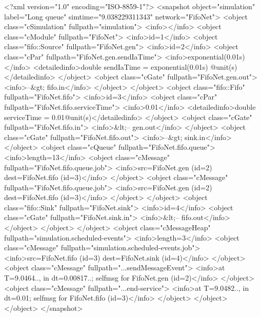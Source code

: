 \begin{filelisting}
<?xml version="1.0" encoding="ISO-8859-1"?>
<snapshot object="simulation" label="Long queue" simtime="9.038229311343"
network="FifoNet">
  <object class="cSimulation" fullpath="simulation">
    <info></info>
    <object class="cModule" fullpath="FifoNet">
      <info>id=1</info>
      <object class="fifo::Source" fullpath="FifoNet.gen">
        <info>id=2</info>
        <object class="cPar" fullpath="FifoNet.gen.sendIaTime">
          <info>exponential(0.01s)</info>
          <detailedinfo>double sendIaTime = exponential(0.01s) @unit(s)
          </detailedinfo>
        </object>
        <object class="cGate" fullpath="FifoNet.gen.out">
          <info>--&gt; fifo.in</info>
        </object>
      </object>
      <object class="fifo::Fifo" fullpath="FifoNet.fifo">
        <info>id=3</info>
        <object class="cPar" fullpath="FifoNet.fifo.serviceTime">
          <info>0.01</info>
          <detailedinfo>double serviceTime = 0.01@unit(s)</detailedinfo>
        </object>
        <object class="cGate" fullpath="FifoNet.fifo.in">
          <info>&lt;-- gen.out</info>
        </object>
        <object class="cGate" fullpath="FifoNet.fifo.out">
          <info>--&gt; sink.in</info>
        </object>
        <object class="cQueue" fullpath="FifoNet.fifo.queue">
          <info>length=13</info>
          <object class="cMessage" fullpath="FifoNet.fifo.queue.job">
            <info>src=FifoNet.gen (id=2)  dest=FifoNet.fifo (id=3)</info>
          </object>
          <object class="cMessage" fullpath="FifoNet.fifo.queue.job">
            <info>src=FifoNet.gen (id=2)  dest=FifoNet.fifo (id=3)</info>
          </object>
        </object>
      <object class="fifo::Sink" fullpath="FifoNet.sink">
        <info>id=4</info>
        <object class="cGate" fullpath="FifoNet.sink.in">
          <info>&lt;-- fifo.out</info>
        </object>
      </object>
    </object>
    <object class="cMessageHeap" fullpath="simulation.scheduled-events">
      <info>length=3</info>
      <object class="cMessage" fullpath="simulation.scheduled-events.job">
        <info>src=FifoNet.fifo (id=3)  dest=FifoNet.sink (id=4)</info>
      </object>
      <object class="cMessage" fullpath="...sendMessageEvent">
        <info>at T=9.0464.., in dt=0.00817..; selfmsg for FifoNet.gen (id=2)</info>
      </object>
      <object class="cMessage" fullpath="...end-service">
        <info>at T=9.0482.., in dt=0.01; selfmsg for FifoNet.fifo (id=3)</info>
      </object>
    </object>
  </object>
</snapshot>

\end{filelisting}



